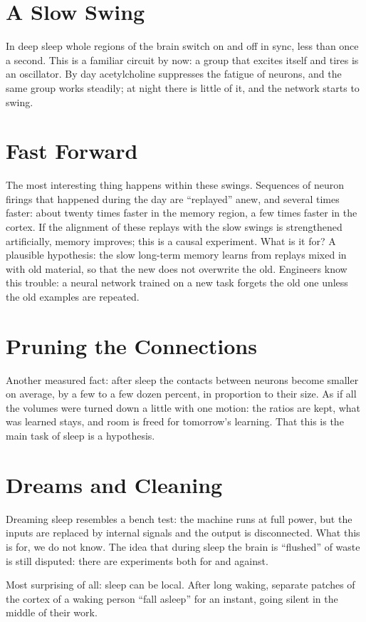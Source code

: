 \section*{A Slow Swing}

In deep sleep whole regions of the brain switch on and off in sync, less than once a second. This is a familiar circuit by now: a group that excites itself and tires is an oscillator. By day acetylcholine suppresses the fatigue of neurons, and the same group works steadily; at night there is little of it, and the network starts to swing.


\section*{Fast Forward}

The most interesting thing happens within these swings. Sequences of neuron firings that happened during the day are ``replayed'' anew, and several times faster: about twenty times faster in the memory region, a few times faster in the cortex. If the alignment of these replays with the slow swings is strengthened artificially, memory improves; this is a causal experiment. What is it for? A plausible hypothesis: the slow long-term memory learns from replays mixed in with old material, so that the new does not overwrite the old. Engineers know this trouble: a neural network trained on a new task forgets the old one unless the old examples are repeated.

\section*{Pruning the Connections}

Another measured fact: after sleep the contacts between neurons become smaller on average, by a few to a few dozen percent, in proportion to their size. As if all the volumes were turned down a little with one motion: the ratios are kept, what was learned stays, and room is freed for tomorrow's learning. That this is the main task of sleep is a hypothesis.

\section*{Dreams and Cleaning}

Dreaming sleep resembles a bench test: the machine runs at full power, but the inputs are replaced by internal signals and the output is disconnected. What this is for, we do not know. The idea that during sleep the brain is ``flushed'' of waste is still disputed: there are experiments both for and against.

Most surprising of all: sleep can be local. After long waking, separate patches of the cortex of a waking person ``fall asleep'' for an instant, going silent in the middle of their work.

